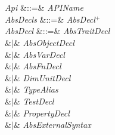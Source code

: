 %
%
%
%

\section{\Apis}

\begin{Grammar}
\emph{Api} &::=&
 \emph{APIName}   
\\

\emph{AbsDecls} &::=& \emph{AbsDecl}$^+$\\

\emph{AbsDecl} &::=& \emph{AbsTraitDecl}\\
&$|$& \emph{AbsObjectDecl}\\
&$|$& \emph{AbsVarDecl}\\
&$|$& \emph{AbsFnDecl}\\
&$|$& \emph{DimUnitDecl}\\
&$|$& \emph{TypeAlias}\\
&$|$& \emph{TestDecl}\\
&$|$& \emph{PropertyDecl}\\
&$|$& \emph{AbsExternalSyntax}\\

\end{Grammar}

